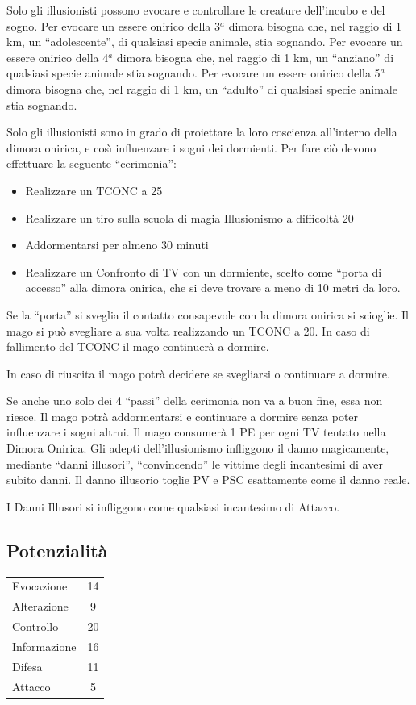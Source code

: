 Solo gli illusionisti possono evocare e controllare le creature
dell'incubo e del sogno. Per evocare un essere onirico della 3$^a${
  d}imora bisogna che, nel raggio di 1 km, un ``adolescente'', di
qualsiasi specie animale, stia sognando. Per evocare un essere onirico
della 4$^a${ d}imora bisogna che, nel raggio di 1 km, un ``anziano''
di qualsiasi specie animale stia sognando. Per evocare un essere
onirico della 5$^a${ d}imora bisogna che, nel raggio di 1 km, un
``adulto'' di qualsiasi specie animale stia sognando.

Solo gli illusionisti sono in grado di proiettare la loro coscienza
all'interno della dimora onirica, e cos\`{\i} influenzare i sogni dei
dormienti. Per fare ci\`o devono effettuare la seguente
``cerimonia'':
\begin{itemize}
\item Realizzare un TCONC a 25
\item Realizzare un tiro sulla scuola di magia Illusionismo a
  difficolt\`a 20
\item Addormentarsi per almeno 30 minuti
\item Realizzare un Confronto di TV con un dormiente, scelto come
  ``porta di accesso'' alla dimora onirica, che si deve trovare a meno
  di 10 metri da loro.
\end{itemize}

Se la ``porta'' si sveglia il contatto consapevole con la dimora
onirica si scioglie. Il mago si pu\`o svegliare a sua volta
realizzando un TCONC a 20. In caso di fallimento del TCONC il mago
continuer\`a a dormire.

In caso di
riuscita il mago potr\`a decidere se svegliarsi o continuare a
dormire. 

Se anche uno solo dei 4 ``passi'' della cerimonia non va a
buon fine, essa non riesce. Il mago potr\`a addormentarsi e
continuare a dormire senza poter influenzare i sogni altrui. Il mago
consumer\`a 1 PE per ogni TV tentato nella Dimora Onirica. Gli
adepti dell'illusionismo infliggono il danno magicamente, mediante
``danni illusori'', ``convincendo'' le vittime degli incantesimi di
aver subito danni. Il danno illusorio toglie PV e PSC esattamente come
il danno reale. 

I Danni Illusori si infliggono come qualsiasi
incantesimo di Attacco.

\subsection{Potenzialit\`a} 
\begin{tabular}{lc}
Evocazione& 14\\
Alterazione& 9 \\
Controllo& 20 \\
Informazione& 16\\
Difesa& 11 \\
Attacco& 5\\
\end{tabular}


